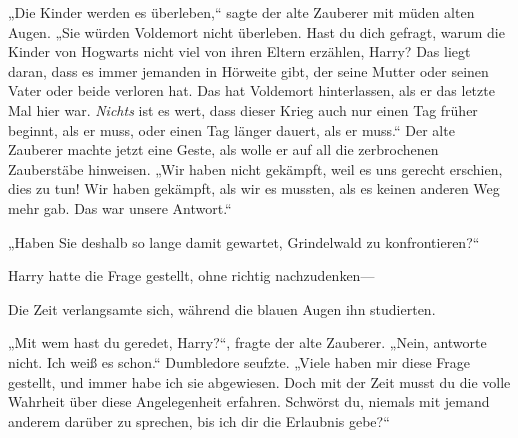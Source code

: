 „Die Kinder werden es überleben,“ sagte der alte Zauberer mit müden alten Augen. „Sie würden Voldemort nicht überleben. Hast du dich gefragt, warum die Kinder von Hogwarts nicht viel von ihren Eltern erzählen, Harry? Das liegt daran, dass es immer jemanden in Hörweite gibt, der seine Mutter oder seinen Vater oder beide verloren hat. Das hat Voldemort hinterlassen, als er das letzte Mal hier war. \emph{Nichts} ist es wert, dass dieser Krieg auch nur einen Tag früher beginnt, als er muss, oder einen Tag länger dauert, als er muss.“ Der alte Zauberer machte jetzt eine Geste, als wolle er auf all die zerbrochenen Zauberstäbe hinweisen. „Wir haben nicht gekämpft, weil es uns gerecht erschien, dies zu tun! Wir haben gekämpft, als wir es mussten, als es keinen anderen Weg mehr gab. Das war unsere Antwort.“

„Haben Sie deshalb so lange damit gewartet, Grindelwald zu konfrontieren?“

Harry hatte die Frage gestellt, ohne richtig nachzudenken—

Die Zeit verlangsamte sich, während die blauen Augen ihn studierten.

„Mit wem hast du geredet, Harry?“, fragte der alte Zauberer. „Nein, antworte nicht. Ich weiß es schon.“ Dumbledore seufzte. „Viele haben mir diese Frage gestellt, und immer habe ich sie abgewiesen. Doch mit der Zeit musst du die volle Wahrheit über diese Angelegenheit erfahren. Schwörst du, niemals mit jemand anderem darüber zu sprechen, bis ich dir die Erlaubnis gebe?“

